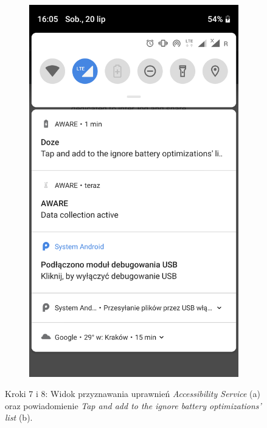 \begin{enumerate}
\begin{figure}[H]
		\begin{subfigure}{0.35\textwidth}
			\centering
			\includegraphics[scale=0.14]{dodatekA/3_8.png}
			\subcaption{\label{subfigure_b}}
		\end{subfigure}
		\caption{ Kroki 7 i 8: Widok przyznawania uprawnień \textit{Accessibility Service} (a) oraz powiadomienie \textit{Tap and add to the ignore battery optimizations' list} (b).}
	\end{figure}
	\clearpage 
	

\end{enumerate}

